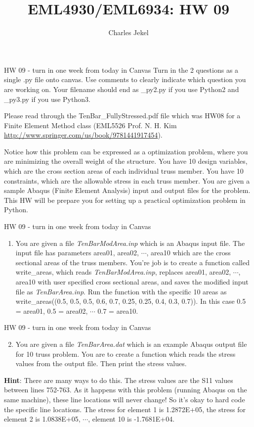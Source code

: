\documentclass[10pt]{beamer}
\title{EML4930/EML6934: HW 09}
\author{Charles Jekel}
\begin{document}
\begin{frame}[fragile]{HW 09 - turn in one week from today in Canvas}
Turn in the 2 questions as a single .py file onto canvas. Use comments to clearly indicate which question you are working on. Your filename should end as \_py2.py if you use Python2 and \_py3.py if you use Python3.

Please read through the TenBar\_FullyStressed.pdf file which was HW08 for a Finite Element Method class (EML5526 Prof. N. H. Kim \url{http://www.springer.com/us/book/9781441917454}). 

Notice how this problem can be expressed as a optimization problem, where you are minimizing the overall weight of the structure. You have 10 design variables, which are the cross section areas of each individual truss member. You have 10 constraints, which are the allowable stress in each truss member. You are given a sample Abaqus (Finite Element Analysis) input and output files for the problem. This HW will be prepare you for setting up a practical optimization problem in Python.


\end{frame}

\begin{frame}[fragile]{HW 09 - turn in one week from today in Canvas}
\begin{enumerate}
\setcounter{enumi}{0}
\item You are given a file \textit{TenBarModArea.inp} which is an Abaqus input file. The input file has parameters area01, area02, $\cdots$, area10 which are the cross sectional areas of the truss members. You're job is to create a function called write\_areas, which reads \textit{TenBarModArea.inp}, replaces area01, area02, $\cdots$, area10 with user specified cross sectional areas, and saves the modified input file as \textit{TenBarArea.inp}. Run the function with the specific 10 areas as write\_areas((0.5, 0.5, 0.5, 0.6, 0.7, 0.25, 0.25, 0.4, 0.3, 0.7)). In this case 0.5 = area01, 0.5 = area02, $\cdots$ 0.7 = area10.
\end{enumerate}
\end{frame}

\begin{frame}[fragile]{HW 09 - turn in one week from today in Canvas}
\begin{enumerate}
\setcounter{enumi}{1}
\item You are given a file \textit{TenBarArea.dat} which is an example Abaqus output file for 10 truss problem. You are to create a function which reads the stress values from the output file. Then print the stress values. 
\end{enumerate}
\textbf{Hint}: There are many ways to do this. The stress values are the S11 values between lines 752-763. As it happens with this problem (running Abaqus on the same machine), these line locations will never change! So it's okay to hard code the specific line locations.  The stress for element 1 is 1.2872E+05, the stress for element 2 is 1.0838E+05, $\cdots$, element 10 is -1.7681E+04. 
\end{frame}
\end{document}
